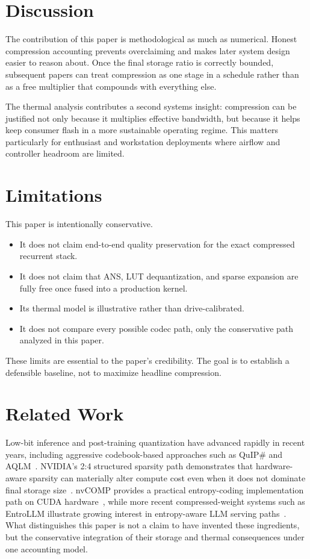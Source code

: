 \documentclass[11pt]{article}
\begin{document}
\section{Discussion}
The contribution of this paper is methodological as much as numerical. Honest compression accounting prevents overclaiming and makes later system design easier to reason about. Once the final storage ratio is correctly bounded, subsequent papers can treat compression as one stage in a schedule rather than as a free multiplier that compounds with everything else.

The thermal analysis contributes a second systems insight: compression can be justified not only because it multiplies effective bandwidth, but because it helps keep consumer flash in a more sustainable operating regime. This matters particularly for enthusiast and workstation deployments where airflow and controller headroom are limited.

\section{Limitations}
This paper is intentionally conservative.
\begin{itemize}
    \item It does not claim end-to-end quality preservation for the exact compressed recurrent stack.
    \item It does not claim that ANS, LUT dequantization, and sparse expansion are fully free once fused into a production kernel.
    \item Its thermal model is illustrative rather than drive-calibrated.
    \item It does not compare every possible codec path, only the conservative path analyzed in this paper.
\end{itemize}

These limits are essential to the paper's credibility. The goal is to establish a defensible baseline, not to maximize headline compression.

\section{Related Work}
Low-bit inference and post-training quantization have advanced rapidly in recent years, including aggressive codebook-based approaches such as QuIP\# and AQLM~\cite{quip,aqlm}. NVIDIA's 2:4 structured sparsity path demonstrates that hardware-aware sparsity can materially alter compute cost even when it does not dominate final storage size~\cite{ampere}. nvCOMP provides a practical entropy-coding implementation path on CUDA hardware~\cite{nvcomp}, while more recent compressed-weight systems such as EntroLLM illustrate growing interest in entropy-aware LLM serving paths~\cite{entro}. What distinguishes this paper is not a claim to have invented these ingredients, but the conservative integration of their storage and thermal consequences under one accounting model.
\end{document}
